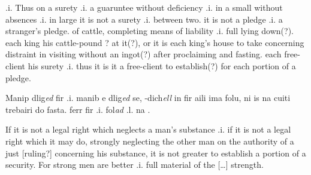 \documentclass[11pt]{article}
\begin{document}
\begin{pages}
  \begin{Rightside}
    \beginnumbering\pstart
    [\ldots{}?] .i. Thus on a surety .i. a guaruntee without deficiency .i. in a small without absences .i. in large it is not a surety .i. between two.  it is not a pledge .i. a stranger's pledge.  of cattle, completing means of liability .i. full lying down(?).  each king his cattle-pound ? at it(?), or it is each king's house to take concerning distraint in visiting without 
an ingot(?) after proclaiming and fasting.  each free-client his surety .i. thus it is it a free-client to establish(?) for each portion of a pledge.
    \pend
    \endnumbering
  \end{Rightside}

  \Pages
\end{pages}

\begin{pages}
\begin{Leftside}
    \beginnumbering\pstart
    Manip dlig\emph{ed}   fir .i. manib e dlig\emph{ed}  se, -dich\emph{ell} in fir aili   ima folu, ni is  na cuiti trebairi do fasta.   ferr fir  .i. fol\emph{ad} .l. na  .
    
    \pend
  \endnumbering
  \end{Leftside}

\begin{Rightside}
    \beginnumbering\pstart
    If it is not a legal right which neglects a man's substance .i. if it is not a legal right which it may do, strongly neglecting the other man on the authority of a just [ruling?] concerning his substance, it is not greater to establish a portion of a security.  For strong men are better .i. full material of the [\ldots] strength. 
    \pend
    \endnumbering
  \end{Rightside}

  \Pages
\end{pages}
\end{document}
